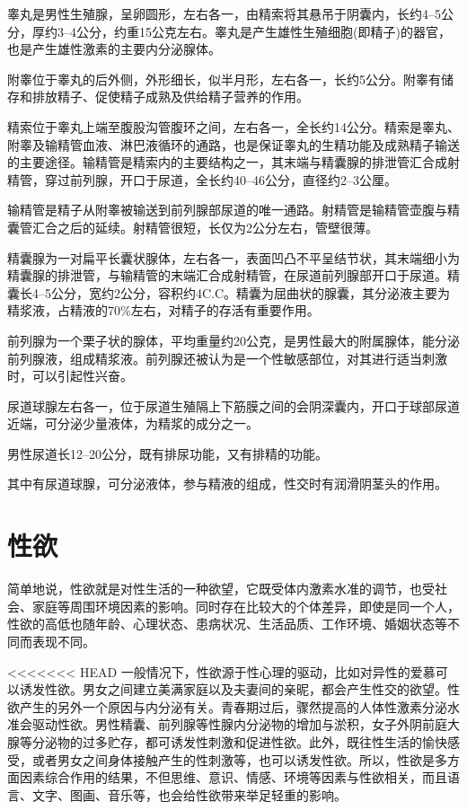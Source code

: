 \documentclass[12pt,UTF8]{ctexbook}
\begin{document}
睾丸是男性生殖腺，呈卵圆形，左右各一，由精索将其悬吊于阴囊内，长约4--5公分，厚约3--4公分，约重15公克左右。睾丸是产生雄性生殖细胞(即精子)的器官，也是产生雄性激素的主要内分泌腺体。

附睾位于睾丸的后外侧，外形细长，似半月形，左右各一，长约5公分。附睾有储存和排放精子、促使精子成熟及供给精子营养的作用。

精索位于睾丸上端至腹股沟管腹环之间，左右各一，全长约14公分。精索是睾丸、附睾及输精管血液、淋巴液循环的通路，也是保证睾丸的生精功能及成熟精子输送的主要途径。输精管是精索内的主要结构之一，其末端与精囊腺的排泄管汇合成射精管，穿过前列腺，开口于尿道，全长约40--46公分，直径约2--3公厘。

输精管是精子从附睾被输送到前列腺部尿道的唯一通路。射精管是输精管壶腹与精囊管汇合之后的延续。射精管很短，长仅为2公分左右，管壁很薄。

精囊腺为一对扁平长囊状腺体，左右各一，表面凹凸不平呈结节状，其末端细小为精囊腺的排泄管，与输精管的末端汇合成射精管，在尿道前列腺部开口于尿道。精囊长4--5公分，宽约2公分，容积约4C.C。精囊为屈曲状的腺囊，其分泌液主要为精浆液，占精液的70\%左右，对精子的存活有重要作用。

前列腺为一个栗子状的腺体，平均重量约20公克，是男性最大的附属腺体，能分泌前列腺液，组成精浆液。前列腺还被认为是一个性敏感部位，对其进行适当刺激时，可以引起性兴奋。

尿道球腺左右各一，位于尿道生殖隔上下筋膜之间的会阴深囊内，开口于球部尿道近端，可分泌少量液体，为精浆的成分之一。

男性尿道长12--20公分，既有排尿功能，又有排精的功能。

其中有尿道球腺，可分泌液体，参与精液的组成，性交时有润滑阴茎头的作用。

\part{性欲}

简单地说，性欲就是对性生活的一种欲望，它既受体内激素水准的调节，也受社会、家庭等周围环境因素的影响。同时存在比较大的个体差异，即使是同一个人，性欲的高低也随年龄、心理状态、患病状况、生活品质、工作环境、婚姻状态等不同而表现不同。

<<<<<<< HEAD
一般情况下，性欲源于性心理的驱动，比如对异性的爱慕可以诱发性欲。男女之间建立美满家庭以及夫妻间的亲昵，都会产生性交的欲望。性欲产生的另外一个原因与内分泌有关。青春期过后，骤然提高的人体性激素分泌水准会驱动性欲。男性精囊、前列腺等性腺内分泌物的增加与淤积，女子外阴前庭大腺等分泌物的过多贮存，都可诱发性刺激和促进性欲。此外，既往性生活的愉快感受，或者男女之间身体接触产生的性刺激等，也可以诱发性欲。所以，性欲是多方面因素综合作用的结果，不但思维、意识、情感、环境等因素与性欲相关，而且语言、文字、图画、音乐等，也会给性欲带来举足轻重的影响。
\end{document}
